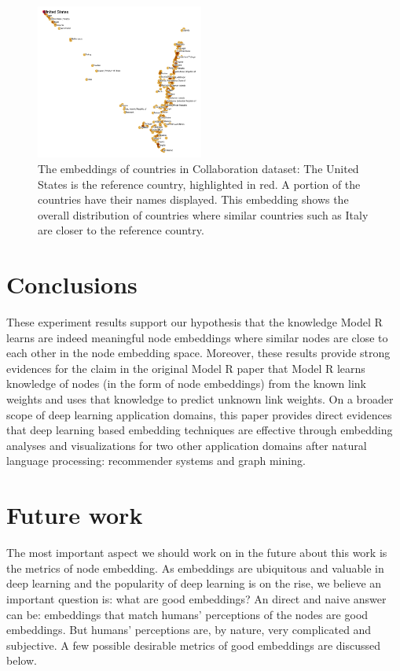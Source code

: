 \documentclass[conference]{IEEEtran}
\begin{document}
\begin{figure}[!ht]\centering
	\includegraphics[width=0.49\textwidth]{countries}
	\caption{
		The embeddings of countries in Collaboration dataset:
		The United States is the reference country, highlighted in red.
		A portion of the countries have their names displayed.
		This embedding shows the overall distribution of countries where similar countries such as Italy are closer to the reference country.
	}
	\label{fig:countries}
\end{figure}

\section{Conclusions}
These experiment results support our hypothesis that the knowledge Model R learns are indeed meaningful node embeddings where similar nodes are close to each other in the node embedding space.
Moreover, these results provide strong evidences for the claim in the original Model R paper that Model R learns knowledge of nodes (in the form of node embeddings) from the known link weights and uses that knowledge to predict unknown link weights.
On a broader scope of deep learning application domains, this paper provides direct evidences that deep learning based embedding techniques are effective through embedding analyses and visualizations for two other application domains after natural language processing: recommender systems and graph mining.

\section{Future work}
The most important aspect we should work on in the future about this work is the metrics of node embedding.
As embeddings are ubiquitous and valuable in deep learning and the popularity of deep learning is on the rise, we believe an important question is: what are good embeddings?
An direct and naive answer can be: embeddings that match humans' perceptions of the nodes are good embeddings.
But humans' perceptions are, by nature, very complicated and subjective.
A few possible desirable metrics of good embeddings are discussed below.
\end{document}
